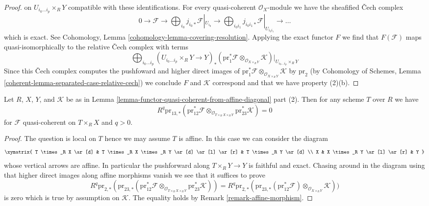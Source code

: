 \begin{proof}
on $U_{i_0 \ldots i_p} \times_R Y$ compatible with these identifications.
For every quasi-coherent $\mathcal{O}_X$-module
we have the sheafified {\v C}ech complex
$$
0 \to \mathcal{F} \to
\bigoplus\nolimits_{i_0} j_{i_0 *}\mathcal{F}|_{U_{i_0}} \to
\bigoplus\nolimits_{i_0i_1} j_{i_0 i_1 *}\mathcal{F}|_{U_{i_0 i_1}} \to
\ldots
$$
which is exact.
See Cohomology, Lemma \ref{cohomology-lemma-covering-resolution}.
Applying the exact functor $F$ we find that $F(\mathcal{F})$
maps quasi-isomorphically to the relative {\v C}ech complex with terms
$$
\bigoplus\nolimits_{i_0 \ldots i_p}
(U_{i_0 \ldots i_p} \times_R Y \to Y)_*(
\text{pr}_1^*\mathcal{F} \otimes_{\mathcal{O}_{X \times_R Y}} \mathcal{K}
)|_{U_{i_0 \ldots i_p} \times_R Y}
$$
Since this {\v C}ech complex computes the pushfoward and
higher direct images of
$\text{pr}_1^*\mathcal{F} \otimes_{\mathcal{O}_{X \times_R Y}} \mathcal{K}$
by $\text{pr}_2$ (by Cohomology of Schemes, Lemma
\ref{coherent-lemma-separated-case-relative-cech})
we conclude $F$ and $\mathcal{K}$ correspond and
that we have property (2)(b).
\end{proof}

\begin{lemma}
\label{lemma-persistence-exactness}
Let $R$, $X$, $Y$, and $\mathcal{K}$ be as in
Lemma \ref{lemma-functor-quasi-coherent-from-affine-diagonal} part (2).
Then for any scheme $T$ over $R$ we have
$$
R^q\text{pr}_{13, *}(\text{pr}_{12}^*\mathcal{F}
\otimes_{\mathcal{O}_{T \times_R X \times_R Y}}
\text{pr}_{23}^*\mathcal{K}) = 0
$$
for $\mathcal{F}$ quasi-coherent on $T \times_R X$ and $q > 0$.
\end{lemma}

\begin{proof}
The question is local on $T$ hence we may assume $T$ is affine.
In this case we can consider the diagram
$$
\xymatrix{
T \times_R X \ar[d] &
T \times_R X \times_R Y \ar[d] \ar[l] \ar[r] &
T \times_R Y \ar[d] \\
X &
X \times_R Y \ar[l] \ar[r] &
Y
}
$$
whose vertical arrows are affine. In particular the pushforward along
$T \times_R Y \to Y$ is faithful and exact. Chasing around in the diagram
using that higher direct images along affine morphisms vanish we see that
it suffices to prove
$$
R^q\text{pr}_{2, *}(
\text{pr}_{23, *}(\text{pr}_{12}^*\mathcal{F}
\otimes_{\mathcal{O}_{T \times_R X \times_R Y}}
\text{pr}_{23}^*\mathcal{K})) =
R^q\text{pr}_{2, *}(
\text{pr}_{23, *}(\text{pr}_{12}^*\mathcal{F})
\otimes_{\mathcal{O}_{X \times_R Y}}
\mathcal{K}))
$$
is zero which is true by assumption on $\mathcal{K}$.
The equality holds by Remark \ref{remark-affine-morphism}.
\end{proof}

